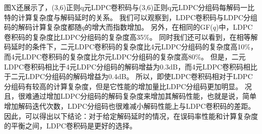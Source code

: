 图X还展示了，(3,6)正则q元LDPC卷积码与(3,6)正则q元LDPC分组码每解码一比特的计算复杂度与解码延时的关系。
我们可以观察到，LDPC卷积码与LDPC分组码的解码计算复杂度都随$q$的增大而指数增加。
另外，在相同的GF($q$)中，LDPC卷积码的复杂度比LDPC分组码的复杂度高35\%。
同时我们还可以看到，在相等解码延时的条件下，二元LDPC卷积码的复杂度比4元LDPC分组码的复杂度高10\%，而4元LDPC卷积码的复杂度比尔元LDPC分组码的复杂度高80\%。
但是，二元LDPC卷积码相比于4元LDPC分组码的解码增益为0.3dB，而4元LDPC卷积码相比于二元LDPC分组码的解码增益为0.4dB。
所以，即使LDPC卷积码相对于LDPC分组码有较高的计算复杂度，但是它性能的增加量比LDPC分组码更加明显。
况且，很难通过增加LDPC分组码的解码复杂度来增加其解码性能，也就是说，简单增加解码迭代次数，LDPC分组码也很难减小解码性能上与LDPC卷积码的差距。
因此，可以得出以下结论：对于给定解码延时的情况，在误码率性能和计算复杂度的平衡之间，LDPC卷积码是更好的选择。












